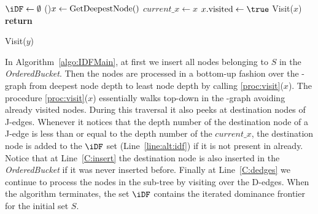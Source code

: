 {\begin{algorithm}

  $\iDF \gets \emptyset$\;
  \While(){$x \gets \textrm{GetDeepestNode}()$}{  \label{C:get} 
    $\textit{current\_x} \gets x$\;
    $x.\visited \gets \true$\;
    Visit($x$)
  }
  \textbf{return} \iDF
\end{algorithm}

\begin{procedure}
  \caption{Visit($y$)}
  \label{proc:visit}
\end{procedure}

In Algorithm~\ref{algo:IDFMain}, at first we insert all nodes belonging to $S$ in the \textit{OrderedBucket}. 
Then the nodes are processed in a bottom-up fashion over the \DJ-graph from deepest node depth to least node depth by calling \ref{proc:visit}($x$). 
The procedure \ref{proc:visit}($x$) essentially walks top-down in the \DJ-graph avoiding already visited nodes. 
During this traversal it also peeks at destination nodes of J-edges.  Whenever 
it notices that the depth number of the destination node of a J-edge is less 
than or equal to the depth number of the $\textit{current\_x}$, the destination 
node is added to the $\iDF$ set (Line~\ref{line:alt:idf}) if it is not present 
in \iDF already.  Notice that at Line~\ref{C:insert} the destination node is 
also inserted in the {\it OrderedBucket} if it was never inserted before.  
Finally at Line~\ref{C:dedges} we continue to process the nodes in the sub-tree 
by visiting over the D-edges.  When the algorithm terminates, the set $\iDF$ 
contains the iterated dominance frontier for the initial set $S$.

}
